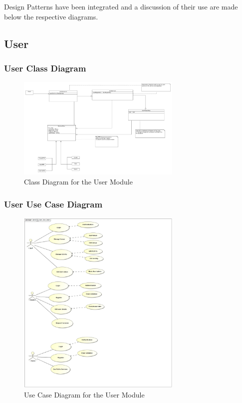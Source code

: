 \documentclass[runningheads,a4paper]{article}
\begin{document}
Design Patterns have been integrated and a discussion of their use are made below the respective diagrams.

\subsection{User} 
\subsubsection{User Class Diagram}
\begin{figure}[H]
   	\centering
   	\includegraphics[width=0.7\textwidth]{Images/Diagrams/User Module/User_Class_Diagrams.png}
   	\caption{Class Diagram for the User Module}
\end{figure}

\subsubsection{User Use Case Diagram}
\begin{figure}[H]
   	\centering
   	\includegraphics[width=0.7\textwidth]{Images/Diagrams/User Module/User_Use_Case.jpg}
   	\caption{Use Case Diagram for the User Module}
\end{figure}
\end{document}

